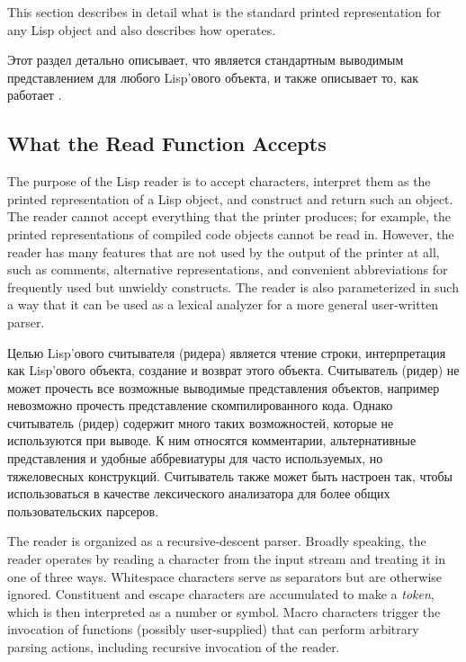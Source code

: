 This section describes in detail what is the standard printed
representation for any Lisp object and also describes how  operates.

Этот раздел детально описывает, что является стандартным выводимым
представлением для любого Lisp'ового объекта, и также описывает то, как работает
.

\subsection{What the Read Function Accepts}
\label{READER}


The purpose of the Lisp reader is to accept characters, interpret them
as the printed representation of a Lisp object, and construct and
return such an object.  The reader cannot accept everything that the
printer produces; for example, the printed representations of compiled
code objects cannot be read in.  However, the reader has
many features that are not used by the output of the printer at all,
such as comments, alternative representations, and convenient
abbreviations for frequently used but unwieldy constructs.  The reader is
also parameterized in such a way that it can be used as a lexical
analyzer for a more general user-written parser.

Целью Lisp'ового считывателя (ридера) является чтение строки,
интерпретация как Lisp'ового объекта, создание и возврат этого
объекта. Считыватель (ридер) не может прочесть все возможные
выводимые представления объектов, например невозможно прочесть
представление скомпилированного кода. Однако считыватель (ридер)
содержит много таких возможностей, которые не используются при
выводе. К ним относятся комментарии, альтернативные представления и
удобные аббревиатуры для часто используемых, но тяжеловесных
конструкций. Считыватель также может быть настроен так, чтобы
использоваться в качестве лексического анализатора для более общих
пользовательских парсеров.

The reader is organized as a recursive-descent parser.
Broadly speaking,
the reader operates by reading a character from
the input stream and treating it in one of three ways.
Whitespace characters serve as separators but are otherwise
ignored.  Constituent and escape characters are accumulated
to make a \emph{token}, which is then interpreted as a number or symbol.
Macro characters trigger the invocation of functions (possibly
user-supplied) that can perform arbitrary parsing actions,
including recursive invocation of the reader.

